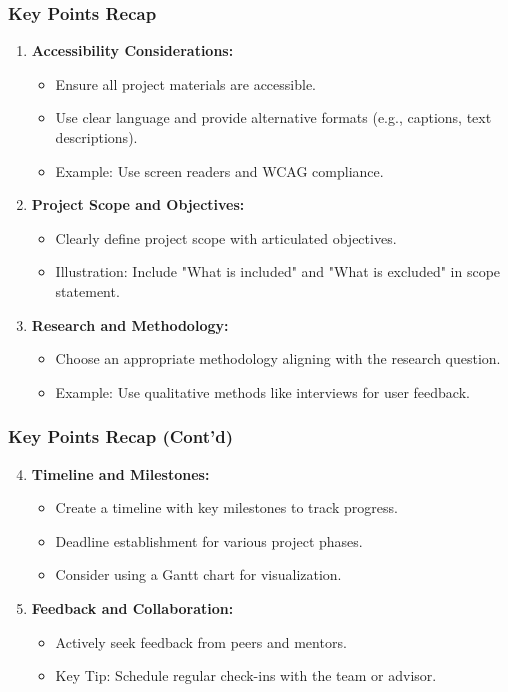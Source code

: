 \documentclass[aspectratio=169]{beamer}
\begin{document}
\begin{frame}[fragile]
    \frametitle{Key Points Recap}
    \begin{enumerate}
        \item \textbf{Accessibility Considerations:}
        \begin{itemize}
            \item Ensure all project materials are accessible.
            \item Use clear language and provide alternative formats (e.g., captions, text descriptions).
            \item Example: Use screen readers and WCAG compliance.
        \end{itemize}
        
        \item \textbf{Project Scope and Objectives:}
        \begin{itemize}
            \item Clearly define project scope with articulated objectives.
            \item Illustration: Include "What is included" and "What is excluded" in scope statement.
        \end{itemize}
        
        \item \textbf{Research and Methodology:}
        \begin{itemize}
            \item Choose an appropriate methodology aligning with the research question.
            \item Example: Use qualitative methods like interviews for user feedback.
        \end{itemize}
    \end{enumerate}
\end{frame}

\begin{frame}[fragile]
    \frametitle{Key Points Recap (Cont'd)}
    \begin{enumerate}
        \setcounter{enumi}{3}
        \item \textbf{Timeline and Milestones:}
        \begin{itemize}
            \item Create a timeline with key milestones to track progress.
            \item Deadline establishment for various project phases.
            \item Consider using a Gantt chart for visualization.
        \end{itemize}
        
        \item \textbf{Feedback and Collaboration:}
        \begin{itemize}
            \item Actively seek feedback from peers and mentors.
            \item Key Tip: Schedule regular check-ins with the team or advisor.
        \end{itemize}
    \end{enumerate}
\end{frame}
\end{document}
